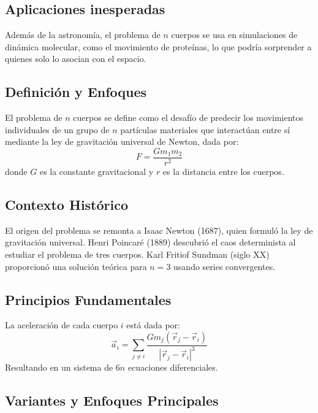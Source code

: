 \subsection{Aplicaciones inesperadas}
Además de la astronomía, el problema de $n$ cuerpos se usa en simulaciones de dinámica molecular, como el movimiento de proteínas, lo que podría sorprender a quienes solo lo asocian con el espacio.

\subsection{Definición y Enfoques}
El problema de $n$ cuerpos se define como el desafío de predecir los movimientos individuales de un grupo de $n$ partículas materiales que interactúan entre sí mediante la ley de gravitación universal de Newton, dada por:
\begin{equation}
    F = \frac{G m_1 m_2}{r^2}
\end{equation}
donde $G$ es la constante gravitacional y $r$ es la distancia entre los cuerpos.

\subsection{Contexto Histórico}
El origen del problema se remonta a Isaac Newton (1687), quien formuló la ley de gravitación universal. Henri Poincaré (1889) descubrió el caos determinista al estudiar el problema de tres cuerpos. Karl Fritiof Sundman (siglo XX) proporcionó una solución teórica para $n=3$ usando series convergentes.

\subsection{Principios Fundamentales}
La aceleración de cada cuerpo $i$ está dada por:
\begin{equation}
    \vec{a}_i = \sum_{j \neq i} \frac{G m_j (\vec{r}_j - \vec{r}_i)}{|\vec{r}_j - \vec{r}_i|^3}
\end{equation}
Resultando en un sistema de $6n$ ecuaciones diferenciales.

\subsection{Variantes y Enfoques Principales}

